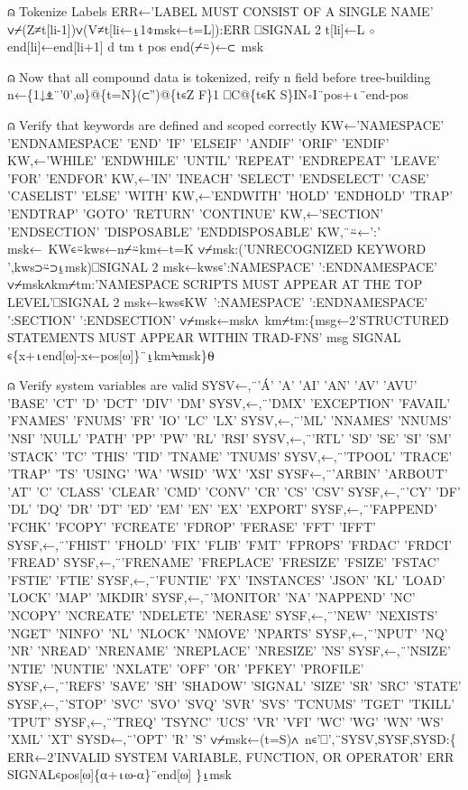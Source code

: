 \documentclass{article}%
\begin{document}
⍝ Tokenize Labels
         ERR←'LABEL MUST CONSIST OF A SINGLE NAME'
         ∨⌿(Z≠t[li-1])∨(V≠t[li←⍸1⌽msk←t=L]):ERR ⎕SIGNAL 2
         t[li]←L ⋄ end[li]←end[li+1]
         d tm t pos end(⌿⍨)←⊂~msk

⍝ Now that all compound data is tokenized, reify n field before tree-building
         n←\{1↓⍎¨'0',⍵\}@\{t=N\}(⊂'')@\{t∊Z F\}1 ⎕C@\{t∊K S\}IN∘I¨pos+⍳¨end-pos

⍝ Verify that keywords are defined and scoped correctly
         KW←'NAMESPACE' 'ENDNAMESPACE' 'END' 'IF' 'ELSEIF' 'ANDIF' 'ORIF' 'ENDIF'
         KW,←'WHILE' 'ENDWHILE' 'UNTIL' 'REPEAT' 'ENDREPEAT' 'LEAVE' 'FOR' 'ENDFOR'
         KW,←'IN' 'INEACH' 'SELECT' 'ENDSELECT' 'CASE' 'CASELIST' 'ELSE' 'WITH'
         KW,←'ENDWITH' 'HOLD' 'ENDHOLD' 'TRAP' 'ENDTRAP' 'GOTO' 'RETURN' 'CONTINUE'
         KW,←'SECTION' 'ENDSECTION' 'DISPOSABLE' 'ENDDISPOSABLE'
         KW,¨⍨←':'
         msk←~KW∊⍨kws←n⌿⍨km←t=K
         ∨⌿msk:('UNRECOGNIZED KEYWORD ',kws⊃⍨⊃⍸msk)⎕SIGNAL 2
         msk←kws∊':NAMESPACE' ':ENDNAMESPACE'
         ∨⌿msk∧km⌿tm:'NAMESPACE SCRIPTS MUST APPEAR AT THE TOP LEVEL'⎕SIGNAL 2
         msk←kws∊KW~':NAMESPACE' ':ENDNAMESPACE' ':SECTION' ':ENDSECTION'
         ∨⌿msk←msk∧~km⌿tm:\{msg←2'STRUCTURED STATEMENTS MUST APPEAR WITHIN TRAD-FNS'
                 msg SIGNAL ∊\{x+⍳end[⍵]-x←pos[⍵]\}¨⍸km⍀msk\}⍬

⍝ Verify system variables are valid
         SYSV←,¨'Á' 'A' 'AI' 'AN' 'AV' 'AVU' 'BASE' 'CT' 'D' 'DCT' 'DIV' 'DM'
         SYSV,←,¨'DMX' 'EXCEPTION' 'FAVAIL' 'FNAMES' 'FNUMS' 'FR' 'IO' 'LC' 'LX'
         SYSV,←,¨'ML' 'NNAMES' 'NNUMS' 'NSI' 'NULL' 'PATH' 'PP' 'PW' 'RL' 'RSI'
         SYSV,←,¨'RTL' 'SD' 'SE' 'SI' 'SM' 'STACK' 'TC' 'THIS' 'TID' 'TNAME' 'TNUMS'
         SYSV,←,¨'TPOOL' 'TRACE' 'TRAP' 'TS' 'USING' 'WA' 'WSID' 'WX' 'XSI'
         SYSF←,¨'ARBIN' 'ARBOUT' 'AT' 'C' 'CLASS' 'CLEAR' 'CMD' 'CONV' 'CR' 'CS' 'CSV'
         SYSF,←,¨'CY' 'DF' 'DL' 'DQ' 'DR' 'DT' 'ED' 'EM' 'EN' 'EX' 'EXPORT'
         SYSF,←,¨'FAPPEND' 'FCHK' 'FCOPY' 'FCREATE' 'FDROP' 'FERASE' 'FFT' 'IFFT'
         SYSF,←,¨'FHIST' 'FHOLD' 'FIX' 'FLIB' 'FMT' 'FPROPS' 'FRDAC' 'FRDCI' 'FREAD'
         SYSF,←,¨'FRENAME' 'FREPLACE' 'FRESIZE' 'FSIZE' 'FSTAC' 'FSTIE' 'FTIE'
         SYSF,←,¨'FUNTIE' 'FX' 'INSTANCES' 'JSON' 'KL' 'LOAD' 'LOCK' 'MAP' 'MKDIR'
         SYSF,←,¨'MONITOR' 'NA' 'NAPPEND' 'NC' 'NCOPY' 'NCREATE' 'NDELETE' 'NERASE'
         SYSF,←,¨'NEW' 'NEXISTS' 'NGET' 'NINFO' 'NL' 'NLOCK' 'NMOVE' 'NPARTS'
         SYSF,←,¨'NPUT' 'NQ' 'NR' 'NREAD' 'NRENAME' 'NREPLACE' 'NRESIZE' 'NS'
         SYSF,←,¨'NSIZE' 'NTIE' 'NUNTIE' 'NXLATE' 'OFF' 'OR' 'PFKEY' 'PROFILE'
         SYSF,←,¨'REFS' 'SAVE' 'SH' 'SHADOW' 'SIGNAL' 'SIZE' 'SR' 'SRC' 'STATE'
         SYSF,←,¨'STOP' 'SVC' 'SVO' 'SVQ' 'SVR' 'SVS' 'TCNUMS' 'TGET' 'TKILL' 'TPUT'
         SYSF,←,¨'TREQ' 'TSYNC' 'UCS' 'VR' 'VFI' 'WC' 'WG' 'WN' 'WS' 'XML' 'XT'
         SYSD←,¨'OPT' 'R' 'S'
         ∨⌿msk←(t=S)∧~n∊'⎕',¨SYSV,SYSF,SYSD:\{
                 ERR←2'INVALID SYSTEM VARIABLE, FUNCTION, OR OPERATOR'
                 ERR SIGNAL∊pos[⍵]\{⍺+⍳⍵-⍺\}¨end[⍵]
         \}⍸msk
\end{document}
